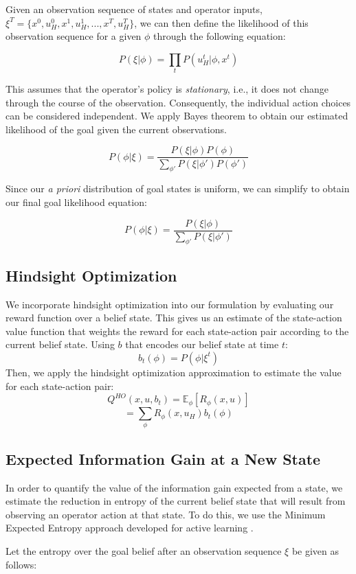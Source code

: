 \documentclass[conference]{IEEEtran}
\begin{document}
Given an observation sequence of states and operator inputs, $\xi^T = \{x^0, u_H^0, x^1, u_H^1, ..., x^T, u_H^T\}$, we can then define the likelihood of this observation sequence for a given $\phi$ through the following equation:

\[
P(\xi|\phi) = \prod_tP(u_H^t|\phi, x^t)
\]

This assumes that the operator's policy is \textit{stationary}, i.e., it does not change through the course of the observation. Consequently, the individual action choices can be considered independent. We apply Bayes theorem to obtain our estimated likelihood of the goal given the current observations.

\[
P(\phi|\xi) = \frac{P(\xi|\phi)P(\phi)}{\sum_{\phi'}P(\xi|\phi')P(\phi')}
\]

Since our \textit{a priori} distribution of goal states is uniform, we can simplify to obtain our final goal likelihood equation:

\[
P(\phi|\xi) = \frac{P(\xi|\phi)}{\sum_{\phi'}P(\xi|\phi')}
\]

\subsection{Hindsight Optimization}

We incorporate hindsight optimization \cite{javdani2015shared} into our formulation by evaluating our reward function over a belief state. This gives us an estimate of the state-action value function that weights the reward for each state-action pair according to the current belief state. Using $b$ that encodes our belief state at time $t$:
\[
b_t(\phi) = P(\phi|\xi^t)
\]
Then, we apply the hindsight optimization approximation to estimate the value for each state-action pair:
\[
Q^{HO}(x,u,b_t) = \mathbb{E}_\phi[R_\phi (x, u)]
\]
\[
=\sum_\phi R_\phi (x, u_H)b_t(\phi)
\]

\subsection{Expected Information Gain at a New State}

In order to quantify the value of the information gain expected from a state, we estimate the reduction in entropy of the current belief state that will result from observing an operator action at that state. To do this, we use the Minimum Expected Entropy approach developed for active learning \cite{holub2008entropy}.

Let the entropy over the goal belief after an observation sequence $\xi$ be given as follows:
\end{document}
